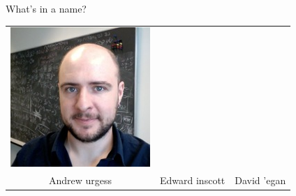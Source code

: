 \documentclass[xcolor=table,aspectratio=169]{beamer}
\numberwithin{equation}{section}
\begin{document}
\begin{frame}{What's in a name?}
\begin{center}
\begin{tabularx}{0.7\textwidth}{CCC}
            \includegraphics[height = 0.4\paperheight]{figures/david_oregan.jpg}    \\
            Andrew urgess                                    &
            Edward inscott                                   &
            David 'egan                   \\
        \end{tabularx}
    \end{center}

\end{frame}
\end{document}
